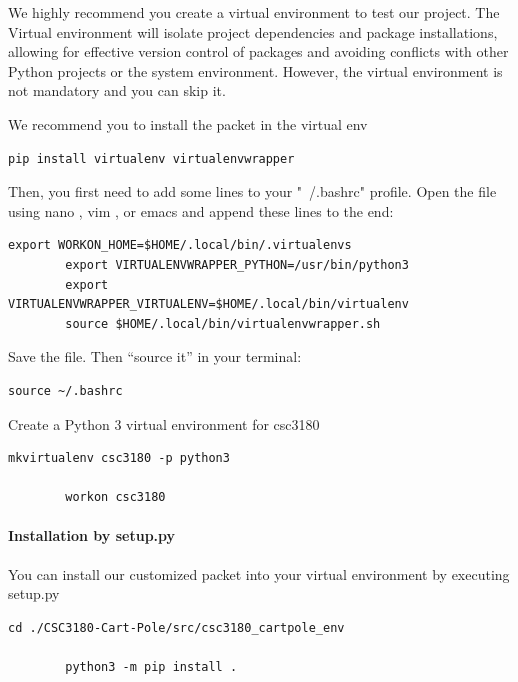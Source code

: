 \documentclass[10pt,a4paper]{article}
\begin{document}
	We highly recommend you create a virtual environment to test our project. The Virtual environment will isolate project dependencies and package installations, allowing for effective version control of packages and avoiding conflicts with other Python projects or the system environment. However, the virtual environment is not mandatory and you can skip it.
	
	We recommend you to install the packet in the virtual env
	
	\begin{lstlisting}[caption={Installation of virtualenv}]
		pip install virtualenv virtualenvwrapper
	\end{lstlisting}
	
	Then, you first need to add some lines to your "~/.bashrc" profile. Open the file using nano , vim , or emacs and append these lines to the end:
	
	\begin{lstlisting}[caption={Setup of Environment Path}]
		export WORKON_HOME=$HOME/.local/bin/.virtualenvs
		export VIRTUALENVWRAPPER_PYTHON=/usr/bin/python3
		export VIRTUALENVWRAPPER_VIRTUALENV=$HOME/.local/bin/virtualenv
		source $HOME/.local/bin/virtualenvwrapper.sh
	\end{lstlisting}
	
	Save the file. Then “source it” in your terminal:
	
	\begin{lstlisting}[caption={Setup of Environment Path}]
		source ~/.bashrc
	\end{lstlisting}
	
	Create a Python 3 virtual environment for csc3180
	
	\begin{lstlisting}[caption={Create a Virtual-Env}]
		mkvirtualenv csc3180 -p python3
		
		workon csc3180
	\end{lstlisting}
	
	
	\paragraph{Installation by setup.py}
	
	You can install our customized packet into your virtual environment by executing setup.py
	
	\begin{lstlisting}[caption={To use setup.py to install our env packet}]
		cd ./CSC3180-Cart-Pole/src/csc3180_cartpole_env
		
		python3 -m pip install .
	\end{lstlisting}
	
\end{document}
